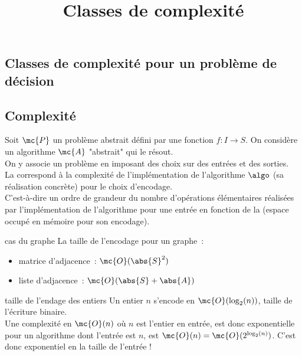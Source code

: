 

\begin{adjustwidth}{-3cm}{-3cm}

\setcounter{chapitre}{11}
\title{Classes de complexité}
\maketitle
\section{Classes de complexité pour un problème de décision}
\subsection{Complexité}

\newcommand{\pbm}[]{\mc{P}}

\begin{definition}{}{}
    Soit $\mc{P}$ un problème abstrait défini par une fonction $f:I\to S$. On considère un algorithme $\mc{A}$ "abstrait" qui le résout.\\
    On y associe un problème  en imposant des choix sur  des entrées et des sorties.\\
    La  correspond à la complexité de l'implémentation de l'algorithme $\algo$ (sa réalisation concrète) pour le choix d'encodage.\\
    C'est-à-dire un ordre de grandeur du nombre d'opérations élémentaires réalisées par l'implémentation de l'algorithme pour une entrée en fonction de la  (espace occupé en mémoire pour son encodage).
\end{definition}

\begin{remarque}{}{cas du graphe}
    La taille de l'encodage pour un graphe~:
    \begin{itemize}
        \item matrice d'adjacence~: $\mc{O}(\abs{S}^2)$
        \item liste d'adjacence~: $\mc{O}(\abs{S} + \abs{A})$
    \end{itemize}
\end{remarque}

\begin{exemple}{}{taille de l'endage des entiers}
    Un entier $n$ s'encode en $\mc{O}(\log_2(n))$, taille de l'écriture binaire.\\
    Une complexité en $\mc{O}(n)$ où $n$ est l'entier en entrée, est donc exponentielle pour un algorithme dont l'entrée est $n$, est $\mc{O}(n) = \mc{O}(2^{\log_2(n)})$. C'est donc exponentiel en la taille de l'entrée !
\end{exemple}


\end{adjustwidth}
